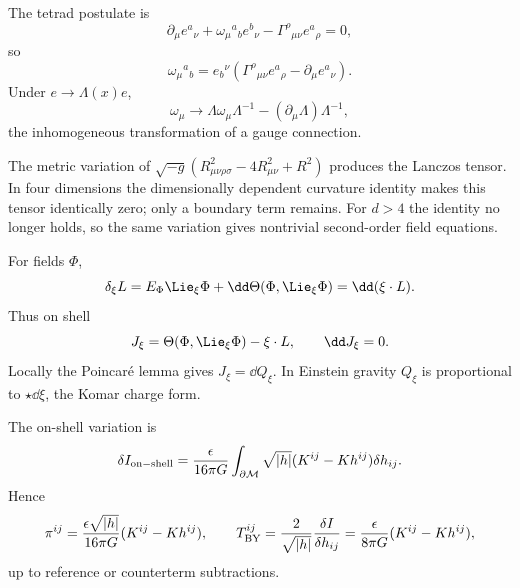 \begin{solution}
The tetrad postulate is
\[
\partial_\mu e^a{}_\nu+\omega_\mu{}^a{}_b e^b{}_\nu
-\Gamma^\rho{}_{\mu\nu}e^a{}_\rho=0,
\]
so
\[
\omega_\mu{}^a{}_b
=e_b{}^\nu(\Gamma^\rho{}_{\mu\nu}e^a{}_\rho-\partial_\mu e^a{}_\nu).
\]
Under \(e\to\Lambda(x)e\),
\[
\omega_\mu\to\Lambda\omega_\mu\Lambda^{-1}
-(\partial_\mu\Lambda)\Lambda^{-1},
\]
the inhomogeneous transformation of a gauge connection.
\end{solution}

\begin{solution}
The metric variation of
\(\sqrt{-g}(R_{\mu\nu\rho\sigma}^2-4R_{\mu\nu}^2+R^2)\) produces the
Lanczos tensor.  In four dimensions the dimensionally dependent curvature
identity makes this tensor identically zero; only a boundary term remains.
For \(d>4\) the identity no longer holds, so the same variation gives
nontrivial second-order field equations.
\end{solution}

\begin{solution}
For fields \(\Phi\),
\[
\delta_\xi L=E_\Phi\Lie_\xi\Phi+\dd\Theta(\Phi,\Lie_\xi\Phi)
=\dd(\xi\cdot L).
\]
Thus on shell
\[
J_\xi=\Theta(\Phi,\Lie_\xi\Phi)-\xi\cdot L,\qquad \dd J_\xi=0.
\]
Locally the Poincar\'e lemma gives \(J_\xi=\dd Q_\xi\).  In Einstein gravity
\(Q_\xi\) is proportional to \(\star\dd\xi\), the Komar charge form.
\end{solution}

\begin{solution}
The on-shell variation is
\[
\delta I_{\rm on-shell}
=\frac{\epsilon}{16\pi G}\int_{\partial\mathcal M}\sqrt{|h|}
(K^{ij}-Kh^{ij})\delta h_{ij}.
\]
Hence
\[
\pi^{ij}=\frac{\epsilon\sqrt{|h|}}{16\pi G}(K^{ij}-Kh^{ij}),
\qquad
T_{\rm BY}^{ij}=\frac{2}{\sqrt{|h|}}\frac{\delta I}{\delta h_{ij}}
=\frac{\epsilon}{8\pi G}(K^{ij}-Kh^{ij}),
\]
up to reference or counterterm subtractions.
\end{solution}
